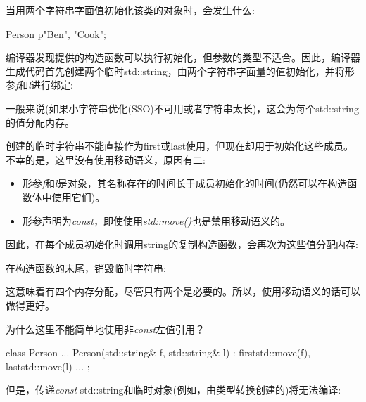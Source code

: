 当用两个字符串字面值初始化该类的对象时，会发生什么:\par

\begin{codebox}[cpp]
Person p{"Ben", "Cook"};
\end{codebox}

编译器发现提供的构造函数可以执行初始化，但参数的类型不适合。因此，编译器生成代码首先创建两个临时std::string，由两个字符串字面量的值初始化，并将形参\textit{f}和\textit{l}进行绑定:\par


一般来说(如果小字符串优化(SSO)不可用或者字符串太长)，这会为每个std::string的值分配内存。\par

创建的临时字符串不能直接作为first或last使用，但现在却用于初始化这些成员。不幸的是，这里没有使用移动语义，原因有二:\par

\begin{itemize}
  \item 形参\textit{f}和\textit{l}是对象，其名称存在的时间长于成员初始化的时间(仍然可以在构造函数体中使用它们)。
  \item 形参声明为\textit{const}，即使使用\textit{std::move()}也是禁用移动语义的。
\end{itemize}

因此，在每个成员初始化时调用string的复制构造函数，会再次为这些值分配内存:\par


在构造函数的末尾，销毁临时字符串:\par


这意味着有四个内存分配，尽管只有两个是必要的。所以，使用移动语义的话可以做得更好。\par


为什么这里不能简单地使用非\textit{const}左值引用？\par

\begin{codebox}[cpp]
class Person {
  ...
  Person(std::string& f, std::string& l)
  : first{std::move(f)}, last{std::move(l)} {
  }
  ...
};
\end{codebox}

但是，传递\textit{const} std::string和临时对象(例如，由类型转换创建的)将无法编译:\par

